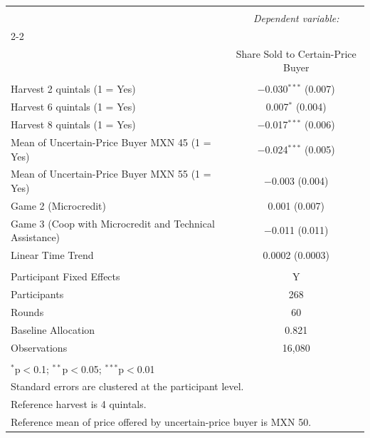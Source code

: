 
\begin{table}[!htbp] \centering 
   
   
\begin{tabular}{@{\extracolsep{5pt}}lc} 
\\[-1.8ex]\hline 
\hline \\[-1.8ex] 
 & \multicolumn{1}{c}{\textit{Dependent variable:}} \\ 
\cline{2-2} 
\\[-1.8ex] & Share Sold to Certain-Price Buyer \\ 
\hline \\[-1.8ex] 
 Harvest 2 quintals (1 = Yes) & $-$0.030$^{***}$ (0.007) \\ 
  Harvest 6 quintals (1 = Yes) & 0.007$^{*}$ (0.004) \\ 
  Harvest 8 quintals (1 = Yes) & $-$0.017$^{***}$ (0.006) \\ 
  Mean of Uncertain-Price Buyer MXN 45 (1 = Yes) & $-$0.024$^{***}$ (0.005) \\ 
  Mean of Uncertain-Price Buyer MXN 55 (1 = Yes) & $-$0.003 (0.004) \\ 
  Game 2 (Microcredit) & 0.001 (0.007) \\ 
  Game 3 (Coop with Microcredit and Technical Assistance) & $-$0.011 (0.011) \\ 
  Linear Time Trend & 0.0002 (0.0003) \\ 
 \hline \\[-1.8ex] 
Participant Fixed Effects & Y \\ 
Participants & 268 \\ 
Rounds & 60 \\ 
Baseline Allocation & 0.821 \\ 
Observations & 16,080 \\ 
\hline 
\hline \\[-1.8ex] 
\multicolumn{2}{l}{$^{*}$p$<$0.1; $^{**}$p$<$0.05; $^{***}$p$<$0.01} \\ 
\multicolumn{2}{l}{Standard errors are clustered at the participant level.} \\ 
\multicolumn{2}{l}{Reference harvest is 4 quintals.} \\ 
\multicolumn{2}{l}{Reference mean of price offered by uncertain-price buyer is MXN 50.} \\ 
\end{tabular} 
\end{table} 
